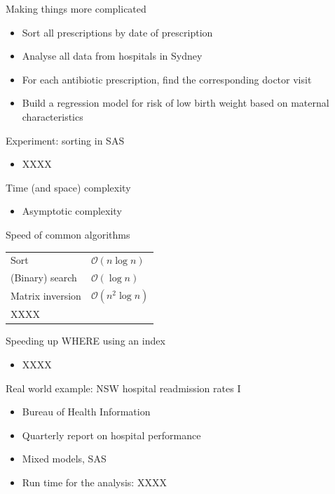 \documentclass[aspectratio=169,12pt,usepdftitle=false]{beamer} %
\begin{document}
\begin{frame}{Making things more complicated}
    \begin{itemize}
	\item Sort all prescriptions by date of prescription
	\item Analyse all data from hospitals in Sydney
	\item For each antibiotic prescription, find the corresponding doctor visit
	\item Build a regression model for risk of low birth weight based on maternal characteristics
    \end{itemize}
\end{frame}

\begin{frame}{Experiment: sorting in SAS}
    \begin{itemize}
	\item XXXX
    \end{itemize}
\end{frame}

\begin{frame}{Time (and space) complexity}
    \begin{itemize}
	\item Asymptotic complexity %
    \end{itemize}
\end{frame}

\begin{frame}{Speed of common algorithms}
    \begin{tabular}{ll}
	Sort & $\mathcal{O}(n\log{}n)$ \\
	(Binary) search & $\mathcal{O}(\log{}n)$ \\
	Matrix inversion & $\mathcal{O}(n^2\log{}n)$ \\ %
	XXXX %
    \end{tabular}
\end{frame}

\begin{frame}{Speeding up WHERE using an index}
    \begin{itemize}
	\item XXXX
    \end{itemize}
\end{frame}

\begin{frame}{Real world example: NSW hospital readmission rates I}
    \begin{itemize}
	\item Bureau of Health Information
	\item Quarterly report on hospital performance
	\item Mixed models, SAS
	\item Run time for the analysis: XXXX
    \end{itemize}
\end{frame}
\end{document}
